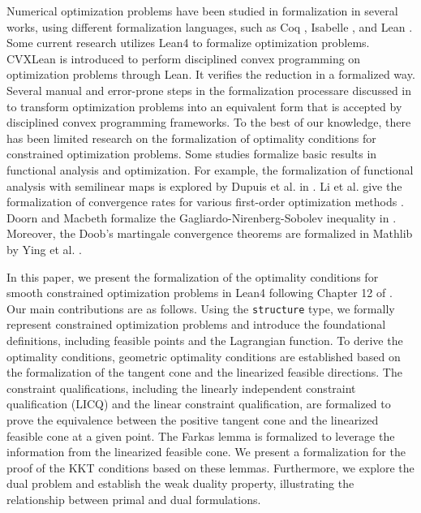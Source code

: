 \documentclass[sn-mathphys]{JORSC-jnl}%
\theoremstyle{thmstyleone}%
\theoremstyle{thmstylethree}%
\newcommand{\lean}[1]{\lstinline[language=lean, mathescape=true]{#1}}
\begin{document}
Numerical optimization problems have been studied in formalization in several works, using different formalization languages, such as Coq \cite{huet1997coq}, Isabelle \cite{Nipkow2002APA}, and Lean \cite{de2015lean}. Some current research utilizes Lean4 to formalize optimization problems. CVXLean \cite{Bentkamp2023Verified} is introduced to perform disciplined convex programming on optimization problems through Lean. It verifies the reduction in a formalized way. Several manual and error-prone steps in the formalization processare discussed in \cite{Fernandez2024Transforming} to transform optimization problems into an equivalent form that is accepted by disciplined convex programming frameworks. To the best of our knowledge, there has been limited research on the formalization of optimality conditions for constrained optimization problems. Some studies formalize basic results in functional analysis and optimization. For example, the formalization of functional analysis with semilinear maps is explored by Dupuis et al. in \cite{dupuis_et_al:LIPIcs.ITP.2022.10}. Li et al. give the formalization of convergence rates for various first-order optimization methods \cite{li2024formalization}.  Doorn and Macbeth formalize the Gagliardo-Nirenberg-Sobolev inequality in \cite{vandoorn_et_al:LIPIcs.ITP.2024.37}. Moreover, the Doob’s martingale convergence theorems are formalized in Mathlib by Ying et al. \cite{Ying2023Doob}. 

In this paper, we present the formalization of the optimality conditions for smooth constrained optimization problems in Lean4 following Chapter 12 of \cite{nocedal1999numerical}. Our main contributions are as follows. Using the \lean{structure} type, we formally represent constrained optimization problems and introduce the foundational definitions, including feasible points and the Lagrangian function. To derive the optimality conditions, geometric optimality conditions are established based on the formalization of the tangent cone and the linearized feasible directions. The constraint qualifications, including the linearly independent constraint qualification (LICQ) and the linear constraint qualification, are formalized to prove the equivalence between the positive tangent cone and the linearized feasible cone at a given point. The Farkas lemma is formalized to leverage the information from the linearized feasible cone. We present a formalization for the proof of the KKT conditions based on these lemmas. Furthermore, we explore the dual problem and establish the weak duality property, illustrating the relationship between primal and dual formulations.
\end{document}
